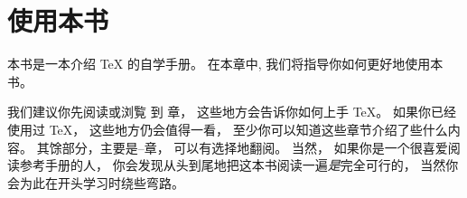 

\chapter{使用本书}



本书是一本介绍 \TeX{} 的自学手册。
在本章中, 我们将指导你如何更好地使用本书。


我们建议你先阅读或浏覧  到 
章，
这些地方会告诉你如何上手 \TeX。
如果你已经使用过 \TeX， 这些地方仍会值得一看，
至少你可以知道这些章节介绍了些什么内容。
其馀部分，主要是--章，
可以有选择地翻阅。
当然， 如果你是一个很喜爱阅读参考手册的人，
你会发现从头到尾地把这本书阅读一遍\emph{是}完全可行的，
当然你会为此在开头学习时绕些弯路。



